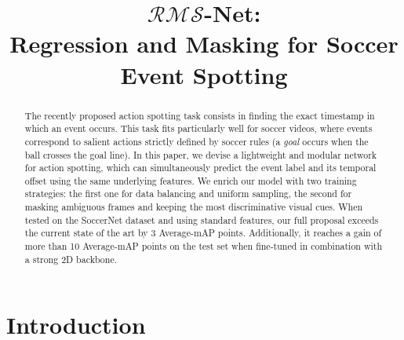 \documentclass[a4paper,conference]{IEEEtran}
\def \OURS {$\mathcal{RMS}$-Net}
\begin{document}
\title{\OURS:\\Regression and Masking for Soccer Event Spotting}


\author{
}













\maketitle

\begin{abstract}
The recently proposed action spotting task consists in finding the exact timestamp in which an event occurs. This task fits particularly well for soccer videos, where events correspond to salient actions strictly defined by soccer rules (a \textit{goal} occurs when the ball crosses the goal line). In this paper, we devise a lightweight and modular network for action spotting, which can simultaneously predict the event label and its temporal offset using the same underlying features. We enrich our model with two training strategies: the first one for data balancing and uniform sampling, the second for masking ambiguous frames and keeping the most discriminative visual cues. When tested on the SoccerNet dataset and using standard features, our full proposal exceeds the current state of the art by 3 Average-mAP points. Additionally, it reaches a gain of more than 10 Average-mAP points on the test set when fine-tuned in combination with a strong 2D backbone.
\end{abstract}






\IEEEpeerreviewmaketitle



\section{Introduction}
\end{document}
